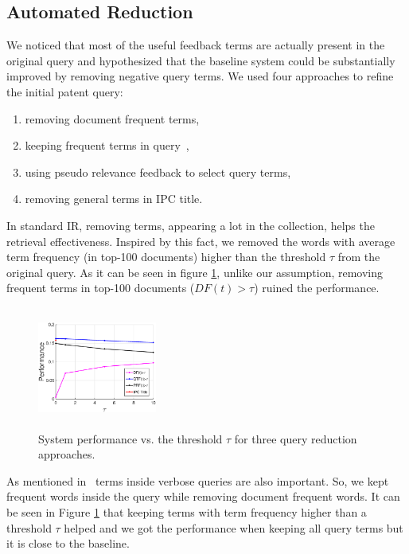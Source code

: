\subsection{Automated Reduction}
We noticed that most of the useful feedback terms are actually present in the original query and hypothesized that the baseline system could be substantially improved by removing negative query terms. We used four approaches to refine the initial patent query: 
\begin{enumerate}
  \item removing document frequent terms,
  \item keeping frequent terms in query~\cite{maxwell2013compact},
  \item using pseudo relevance feedback to select query terms, 
  \item removing general terms in IPC title. 
\end{enumerate}

In standard IR, removing terms, appearing a lot in the collection, helps the retrieval effectiveness. Inspired by this fact, we removed the words with average term frequency (in top-100 documents) higher than the threshold $\tau$ from the original query. As it can be seen in figure \ref{fig:queryreduc}, unlike our assumption, removing frequent terms in top-100 documents ($DF(t)>\tau$) ruined the performance.     
\begin{figure}[htpb]
   \centering
   \includegraphics[width=0.35\textwidth,height=40mm]{figs/queryreduc-ipc.eps}
   \caption{System performance vs. the threshold $\tau$ for three query reduction approaches.}   
   \label{fig:queryreduc} 
\end{figure}

As mentioned in~\cite{maxwell2013compact} terms inside verbose queries are also important. So, we kept frequent words inside the query while removing document frequent words. It can be seen in Figure \ref{fig:queryreduc} that keeping terms with term frequency higher than a threshold $\tau$ helped and we got the performance when keeping all query terms but it is close to the baseline. 

